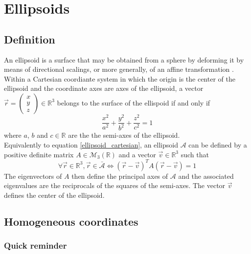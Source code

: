 \documentclass[class=report, float=false, crop=false]{standalone}
\begin{document}
\chapter{Ellipsoids}
\label{appendix:ellipsoids}

\section{Definition}

An ellipsoid is a surface that may be obtained from a sphere by deforming it by means of directional scalings, or more generally, of an affine transformation \cite{wiki:Ellipsoid}.\\

Within a Cartesian coordiante system in which the origin is the center of the ellipsoid and the coordinate axes are axes of the ellipsoid, a vector \(\vec{r} = \begin{pmatrix} x \\ y \\ z \end{pmatrix} \in \mathbb{R}^3\) belongs to the surface of the ellispoid if and only if
\begin{equation}
\frac{x^2}{a^2} + \frac{y^2}{b^2} + \frac{z^2}{c^2} = 1
\label{ellipsoid_cartesian}
\end{equation}
where $a$, $b$ and $c \in \mathbb{R}$ are the the semi-axes of the ellipsoid.\\

Equivalently to equation \ref{ellipsoid_cartesian}, an ellipsoid $\mathcal{A}$ can be defined by a positive definite matrix $A \in \mathcal{M}_3(\mathbb{R})$ and a vector $\vec{v} \in \mathbb{R}^3$ such that
\begin{equation}
\boxed{\forall \vec{r} \in \mathbb{R}^3, \vec{r} \in \bar{\mathcal{A}} \Leftrightarrow (\vec{r}-\vec{v})^TA(\vec{r}-\vec{v}) = 1}
\label{ellipsoid_matrix}
\end{equation}
The eigenvectors of $A$ then define the principal axes of $\mathcal{A}$ and the associated eigenvalues are the reciprocals of the squares of the semi-axes. The vector $\vec{v}$ defines the center of the ellipsoid.

\section{Homogeneous coordinates}

\subsection{Quick reminder}
\end{document}
